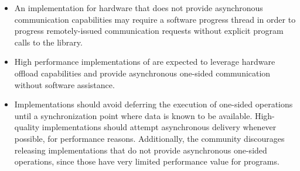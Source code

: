 \begin{itemize}
\item An \openshmem implementation for hardware that does not provide asynchronous communication capabilities may require a software progress thread in order to progress remotely-issued communication requests without explicit program calls to the \openshmem library.
\item High performance implementations of \openshmem are expected to leverage hardware offload capabilities and
    provide asynchronous one-sided communication without software assistance.
\item Implementations should avoid deferring the execution of one-sided operations until a synchronization point where data is known to be available. High-quality implementations should attempt asynchronous delivery whenever possible, for performance reasons. Additionally, the \openshmem community discourages releasing \openshmem implementations that do not provide asynchronous one-sided operations, since those have very limited performance value for \openshmem programs.
\end{itemize}

%
%




